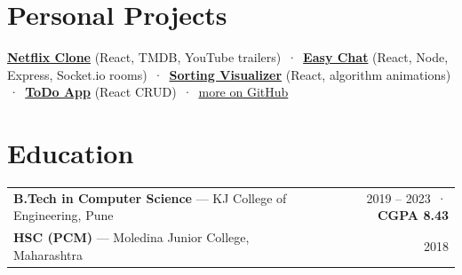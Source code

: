 \documentclass[10pt,a4paper]{article}
\newcommand{\link}[2]{\href{#1}{\color{teal}#2}}
\begin{document}
\section{Personal Projects}
{\small
\link{https://myfirstcloneofnetflix.vercel.app}{\textbf{Netflix Clone}} (React, TMDB, YouTube trailers) \,·\,
\link{https://easilychat.netlify.app}{\textbf{Easy Chat}} (React, Node, Express, Socket.io rooms) \,·\,
\link{https://sortingwithreact.netlify.app}{\textbf{Sorting Visualizer}} (React, algorithm animations) \,·\,
\link{https://aulacube.netlify.app}{\textbf{ToDo App}} (React CRUD) \,·\,
\link{https://github.com/Maheboobkhan}{more on GitHub}}

\section{Education}
\begin{tabularx}{\linewidth}{@{}X r@{}}
\textbf{B.Tech in Computer Science} --- KJ College of Engineering, Pune & 2019 -- 2023 \,·\, \textbf{CGPA 8.43}\\
\textbf{HSC (PCM)} --- Moledina Junior College, Maharashtra & 2018\\
\end{tabularx}
\end{document}

